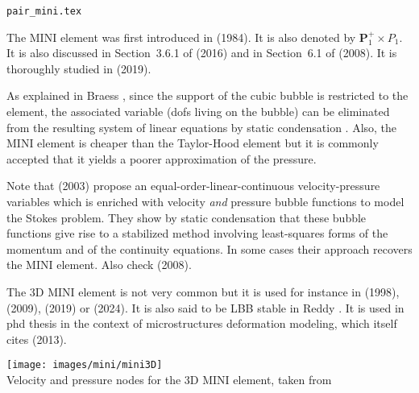 \begin{flushright} {\tiny {\color{gray} \tt pair\_mini.tex}} \end{flushright}

\noindent
\begin{minipage}{0.48\textwidth}
The  MINI element was first introduced in 
\textcite{arbf84} (1984). It is also denoted by ${\bm P}_1^+\times P_1$.
It is also discussed in Section~3.6.1 of \textcite{john16} (2016) and in Section~6.1 
of \textcite{bobf08} (2008). It is thoroughly studied in \textcite{cibo19} (2019).

As explained in Braess \cite{braess}, since the support of the cubic bubble is restricted to the element, 
the associated variable (dofs living on the bubble) can be eliminated from the resulting 
system of linear equations by static condensation \cite{koko19}. 
Also, the MINI element is cheaper than the Taylor-Hood element but it is commonly accepted
that it yields a poorer approximation of the pressure.
\end{minipage}\hfill
\begin{minipage}{0.48\textwidth}

\end{minipage}

\begin{remark}
Note that \textcite{frol03} (2003) propose an equal-order-linear-continuous 
velocity-pressure variables which is enriched 
with velocity {\it and} pressure bubble functions to model the Stokes problem. 
They show by static condensation that
these bubble functions give rise to a stabilized method involving least-squares forms of 
the momentum and of the
continuity equations. In some cases their approach recovers 
the MINI element. Also check \textcite{gamt08} (2008).
\end{remark}

The 3D MINI element is not very common but it is used for instance in \textcite{pico98} (1998),
\textcite{tokv09} (2009), \textcite{koko19} (2019) or \textcite{kuak24} (2024). 
It is also said to be LBB stable in Reddy \cite[p180]{reddybook2}.
It is used in \cite{furstoss} phd thesis in the context of microstructures deformation modeling, 
which itself cites \textcite{camb13} (2013).

\begin{center}
\texttt{[image: images/mini/mini3D]}\\
{\captionfont Velocity and pressure nodes for the 3D MINI element, taken from \cite{pico98}}
\end{center}

